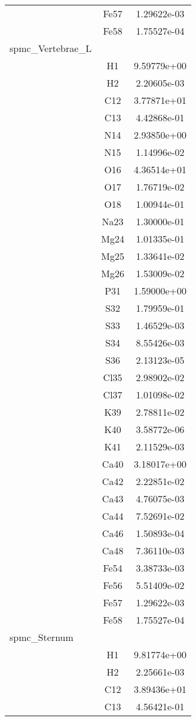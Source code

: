 \begin{centering}
\begin{longtable}{l c c}
& Fe57 & 1.29622e-03 \\ 
& Fe58 & 1.75527e-04 \\ 
\hline
spmc_Vertebrae_L & & \\
\hline
& H1 & 9.59779e+00 \\ 
& H2 & 2.20605e-03 \\ 
& C12 & 3.77871e+01 \\ 
& C13 & 4.42868e-01 \\ 
& N14 & 2.93850e+00 \\ 
& N15 & 1.14996e-02 \\ 
& O16 & 4.36514e+01 \\ 
& O17 & 1.76719e-02 \\ 
& O18 & 1.00944e-01 \\ 
& Na23 & 1.30000e-01 \\ 
& Mg24 & 1.01335e-01 \\ 
& Mg25 & 1.33641e-02 \\ 
& Mg26 & 1.53009e-02 \\ 
& P31 & 1.59000e+00 \\ 
& S32 & 1.79959e-01 \\ 
& S33 & 1.46529e-03 \\ 
& S34 & 8.55426e-03 \\ 
& S36 & 2.13123e-05 \\ 
& Cl35 & 2.98902e-02 \\ 
& Cl37 & 1.01098e-02 \\ 
& K39 & 2.78811e-02 \\ 
& K40 & 3.58772e-06 \\ 
& K41 & 2.11529e-03 \\ 
& Ca40 & 3.18017e+00 \\ 
& Ca42 & 2.22851e-02 \\ 
& Ca43 & 4.76075e-03 \\ 
& Ca44 & 7.52691e-02 \\ 
& Ca46 & 1.50893e-04 \\ 
& Ca48 & 7.36110e-03 \\ 
& Fe54 & 3.38733e-03 \\ 
& Fe56 & 5.51409e-02 \\ 
& Fe57 & 1.29622e-03 \\ 
& Fe58 & 1.75527e-04 \\ 
\hline
spmc_Sternum & & \\
\hline
& H1 & 9.81774e+00 \\ 
& H2 & 2.25661e-03 \\ 
& C12 & 3.89436e+01 \\ 
& C13 & 4.56421e-01 \\ 

\end{longtable}
\end{centering}
